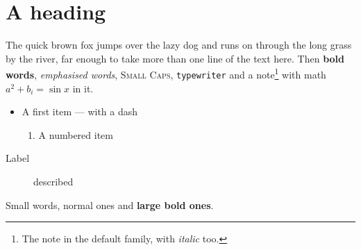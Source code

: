 \documentclass[11pt]{article}
\begin{document}
\section{A heading}
The quick brown fox jumps over the lazy dog and runs on through the long grass by the river, far enough to take more than one line of the text here. Then \textbf{bold words}, \emph{emphasised words}, \textsc{Small Caps}, \texttt{typewriter} and a note\footnote{The note in the default family, with \textit{italic} too.} with math $a^2+b_i = \sin x$ in it.
\begin{itemize}
\item A first item --- with a dash
\begin{enumerate}
\item A numbered item
\end{enumerate}
\end{itemize}
\begin{description}
\item[Label] described
\end{description}
{\small Small words, \textnormal{normal} ones} and {\large\bfseries large bold ones}.
\end{document}
